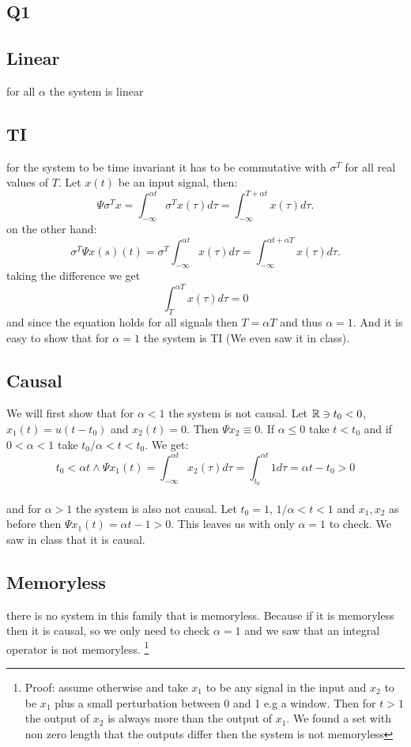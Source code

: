 \subsection{Q1}
\subsection{Linear}
for all $\alpha$ the system is linear
\subsection{TI}
for the system to be time invariant it has to be commutative with $\sigma^T$ for all real values of $T$. Let $x(t)$ be an input signal, then:
\begin{equation}
    \Psi{\sigma^T{x}}=\int_{-\infty}^{\alpha t}
        \sigma^T{x}(\tau)d\tau
        =\int_{-\infty}^{T+\alpha t}x(\tau)d\tau.
\end{equation}
on the other hand:
\begin{equation}
    \sigma^T{\Psi{x}(s)}(t)=\sigma^T{\int_{-\infty}^{\alpha t}x(\tau)d\tau}=\int_{-\infty}^{\alpha t + \alpha T}x(\tau)d\tau.
\end{equation}
taking the difference we get 
$$\int_{T}^{\alpha T}x(\tau)d\tau = 0$$
and since the equation holds for all signals then $T=\alpha T$ and thus $\alpha=1$. And it is easy to show that for $\alpha=1$ the system is TI (We even saw it in class).
\subsection{Causal}
We will first show that for $\alpha< 1$ the system is not causal. Let $\mathbb{R}\ni t_0<0$, $x_1(t)=u(t-t_0)$ and $x_2(t)=0$. Then $\Psi{x_2}\equiv 0$. If $\alpha\leq 0$ take $t<t_0$ and if $0<\alpha<1$ take $t_0/\alpha<t<t_0$. We get:
\[
    t_0 < \alpha t \wedge
    \Psi{x_1}(t)=\int_{-\infty}^{\alpha t} x_2(\tau)d\tau = \int_{t_0}^{\alpha t} 1 d\tau = \alpha t-t_0 > 0
\]
\\
and for $\alpha>1$ the system is also not causal. Let $t_0=1$, $1/\alpha<t<1$ and $x_1,x_2$ as before then $\Psi{x_1}(t)=\alpha t -1>0$.
This leaves us with only $\alpha=1$ to check. We saw in class that it is causal.
\subsection{Memoryless}
there is no system in this family that is memoryless. Because if it is memoryless then it is causal, so we only need to check $\alpha=1$ and we saw that an integral operator is not memoryless. 
\footnote{
Proof: assume otherwise and take $x_1$ to be any signal in the input and $x_2$ to be $x_1$ plus a small perturbation between 0 and 1 e.g a window. Then for $t>1$ the output of $x_2$ is always more than the output of $x_1$. We found a set with non zero length that the outputs differ then the system is not memoryless
}
